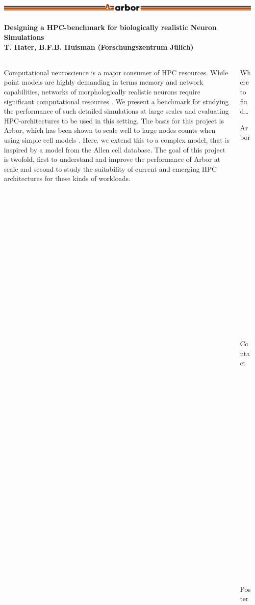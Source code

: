 \documentclass{beamer}
\begin{document}
\newcommand{\nmlcc}{\texttt{nmlcc}}
\newcommand\cpp{C\nolinebreak[4]\hspace{-.05em}\raisebox{.4ex}{\relsize{-3}{\textbf{++}}}}

\begin{frame}[t, fragile]
  \frametitle{\includegraphics[width=0.66\linewidth]{img/arbor-lines-proto-colour-full}}
  \framesubtitle{Designing a HPC-benchmark for biologically realistic Neuron Simulations\\
    \tiny{T. Hater, B.F.B. Huisman (Forschungszentrum Jülich)}}
  \begin{columns}[onlytextwidth,T]
    \begin{column}{0.76\textwidth}
      Computational neuroscience is a major consumer of HPC resources. While
      point models are highly demanding in terms memory and network
      capabilities, networks of morphologically realistic neurons require
      significant computational resources \cite{NEST,arb,nrn}. We present a
      benchmark for studying the performance of such detailed simulations at
      large scales and evaluating HPC-architectures to be used in this setting.
      The basis for this project is Arbor, which has been shown to scale well to
      large nodes counts when using simple cell models \cite{arb}. Here, we
      extend this to a complex model, that is inspired by a model from the Allen
      cell database\cite{allen-v1}. The goal of this project is twofold, first
      to understand and improve the performance of Arbor at scale and second to
      study the suitability of current and emerging HPC architectures for these
      kinds of workloads.
    \end{column}
    \begin{column}{0.22\textwidth}
      \vspace*{-1ex}
      \begin{block}{Where to find\dots}
        \begin{description}
          \item[Arbor] \href{https://arbor-sim.github.io}{arbor-sim.github.io}
          \item[Contact] \href{t.hater@fz-juelich.de}{t.hater@fz-juelich.de}
          \item[Poster] \href{https://github.com/thorstenhater/isc-2023}{github.com/thorstenhater/isc-2023}
        \end{description}

\end{block}
\end{column}
\end{columns}
\end{frame}
\end{document}
